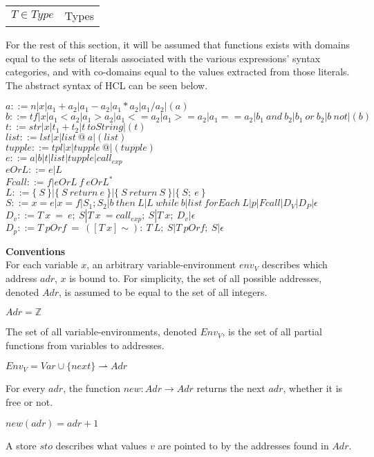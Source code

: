{\begin{center}
\begin{table}[ht]
\begin{tabular}{ll}
			$T \in Type$          & Types
		\end{tabular}
	\end{table}
\end{center}

For the rest of this section, it will be assumed that functions exists with domains equal to the sets of literals associated with the various expressions' syntax categories, and with co-domains equal to the values extracted from those literals.
The abstract syntax of HCL can be seen below.

$a ::= n | x | a_1+a_2 | a_1-a_2 | a_1*a_2 | a_1/a_2 | (a)$\\
$b ::= tf| x | a_1<a_2 | a_1>a_2 | a_1<=a_2| a_1>=a_2| a_1==a_2 | b_1\ and\ b_2 | b_1\ or\ b_2 | b\ not | (b)$\\
$t ::= str| x | t_1 + t_2 | t\ toString | (t)$\\
$list ::= lst | x | list\ @\ a | (list)$\\
$tupple ::= tpl | x | tupple\ @ | (tupple)$\\
$e ::= a | b | t | list | tupple | call_{exp}$\\
$eOrL ::= e | L$\\
$Fcall ::= f | eOrL\ f\ eOrL^*$\\
$L ::= \{\ S\ \} | \{\ S\ return\ e\ \} | \{\ S\ return\ S\ \} | \{\ S;\ e\ \}$\\
$S ::= x = e | x = f | S_1;S_2 | b\ then\ L | L\ while\ b | list\ forEach\ L | p | Fcall | D_V | D_P | \epsilon$\\
$D_v ::= T\ x\ =\ e;\ S | T\ x\ = call_{exp};\ S | T\ x;\ D_v | \epsilon$\\
$D_p ::= T\ pOrf\ =\ ([T\ x]\sim):\ T\ L;\ S |T\ pOrf;\ S | \epsilon$

\textbf{\large{Conventions}} \\
For each variable $x$, an arbitrary variable-environment $env_V$ describes which address $adr$, $x$ is bound to.
For simplicity, the set of all possible addresses, denoted $Adr$, is assumed to be equal to the set of all integers.
\begin{center}
	$Adr = \mathbb{Z}$
\end{center}
The set of all variable-environments, denoted \textbf{$Env_V$}, is the set of all partial functions from variables to addresses.
\begin{center}
	$Env_V = Var \cup \{next\} \rightharpoonup Adr$
\end{center}
For every $adr$, the function $new : Adr \rightarrow Adr$ returns the next $adr$, whether it is free or not.
\begin{center}
	$new (adr) = adr + 1$
\end{center}
A store $sto$ describes what values $v$ are pointed to by the addresses found in $Adr$.

}
